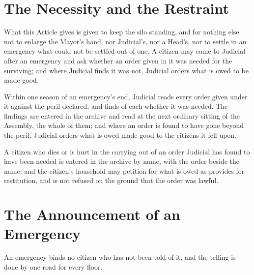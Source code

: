 \section{The Necessity and the Restraint}
\label{sec:emergency:necessity-and-the-restraint}

What this Article gives is given to keep the silo standing, and for nothing else: not to enlarge the Mayor's hand, nor Judicial's, nor a Head's, nor to settle in an emergency what could not be settled out of one. A citizen may come to Judicial after an emergency and ask whether an order given in it was needed for the surviving; and where Judicial finds it was not, Judicial orders what is owed to be made good.

\begin{clauses}
\item Within one season of an emergency's end, Judicial reads every order given under it against the peril declared, and finds of each whether it was needed. The findings are entered in the archive and read at the next ordinary sitting of the Assembly, the whole of them; and where an order is found to have gone beyond the peril, Judicial orders what is owed made good to the citizens it fell upon.
\item A citizen who dies or is hurt in the carrying out of an order Judicial has found to have been needed is entered in the archive by name, with the order beside the name; and the citizen's household may petition for what is owed as  provides for restitution, and is not refused on the ground that the order was lawful.
\end{clauses}

\section{The Announcement of an Emergency}
\label{sec:emergency:announcement-of-an-emergency}

An emergency binds no citizen who has not been told of it, and the telling is done by one road for every floor.

